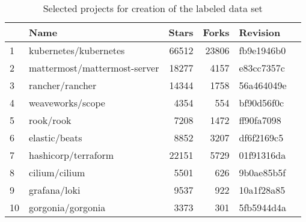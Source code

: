 \begin{table}[h]
    \centering
    \caption{Selected projects for creation of the labeled data set}
    \label{tbl:dataset-projects}
    \begin{tabular}{llrrll}
    \hline
        {}  &                                               Name &  Stars &  Forks &   Revision \\ \hline
        1   &                              kubernetes/kubernetes &  66512 &  23806 &  fb9e1946b0 \\
        2   &                       mattermost/mattermost-server &  18277 &   4157 &  e83cc7357c \\
        3   &                                    rancher/rancher &  14344 &   1758 &  56a464049e \\
        4   &                                   weaveworks/scope &   4354 &    554 &  bf90d56f0c \\
        5   &                                          rook/rook &   7208 &   1472 &  ff90fa7098 \\
        6   &                                      elastic/beats &   8852 &   3207 &  df6f2169c5 \\
        7   &                                hashicorp/terraform &  22151 &   5729 &  01f91316da \\
        8   &                                      cilium/cilium &   5501 &    626 &  9b0ae85b5f \\
        9   &                                       grafana/loki &   9537 &    922 &  10a1f28a85 \\
        10  &                                  gorgonia/gorgonia &   3373 &    301 &  5fb5944d4a \\
        \hline
    \end{tabular}
\end{table}